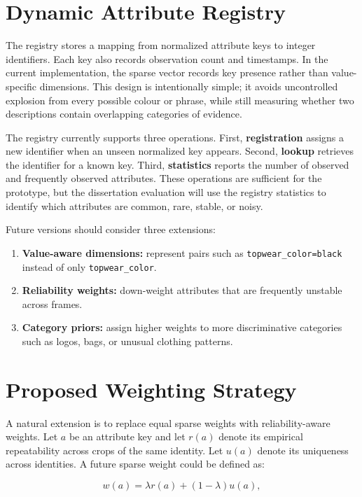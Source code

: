 \section{Dynamic Attribute Registry}

The registry stores a mapping from normalized attribute keys to integer identifiers. Each key also records observation count and timestamps. In the current implementation, the sparse vector records key presence rather than value-specific dimensions. This design is intentionally simple; it avoids uncontrolled explosion from every possible colour or phrase, while still measuring whether two descriptions contain overlapping categories of evidence.

The registry currently supports three operations. First, \textbf{registration} assigns a new identifier when an unseen normalized key appears. Second, \textbf{lookup} retrieves the identifier for a known key. Third, \textbf{statistics} reports the number of observed and frequently observed attributes. These operations are sufficient for the prototype, but the dissertation evaluation will use the registry statistics to identify which attributes are common, rare, stable, or noisy.

Future versions should consider three extensions:

\begin{enumerate}
  \item \textbf{Value-aware dimensions:} represent pairs such as \texttt{topwear\_color=black} instead of only \texttt{topwear\_color}.
  \item \textbf{Reliability weights:} down-weight attributes that are frequently unstable across frames.
  \item \textbf{Category priors:} assign higher weights to more discriminative categories such as logos, bags, or unusual clothing patterns.
\end{enumerate}

\section{Proposed Weighting Strategy}

A natural extension is to replace equal sparse weights with reliability-aware weights. Let $a$ be an attribute key and let $r(a)$ denote its empirical repeatability across crops of the same identity. Let $u(a)$ denote its uniqueness across identities. A future sparse weight could be defined as:

\begin{equation}
w(a) = \lambda r(a) + (1-\lambda)u(a),
\end{equation}

